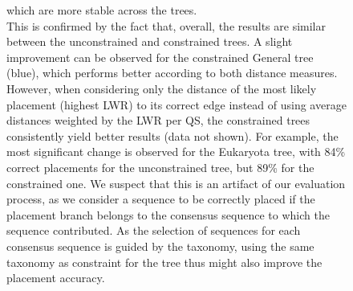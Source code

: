 \begin{figure}[hpbt]
{        which are more stable across the trees.
        \\
        This is confirmed by the fact that, overall,
        the results are similar between the unconstrained and constrained trees.
        A slight improvement can be observed for the constrained General tree (blue),
        which performs better according to both distance measures.
        However, when considering only the distance of the most likely placement (highest \ac{LWR}) to its correct edge
        instead of using average distances weighted by the \ac{LWR} per \ac{QS},
        the constrained trees consistently yield better results (data not shown).
        For example, the most significant change is observed for the Eukaryota tree,
        with 84\% correct placements for the unconstrained tree, but 89\% for the constrained one.
        We suspect that this is an artifact of our evaluation process,
        as we consider a sequence to be correctly placed if the placement branch belongs to the consensus sequence
        to which the sequence contributed.
        As the selection of sequences for each consensus sequence is guided by the taxonomy,
        using the same taxonomy as constraint for the tree thus might also improve the placement accuracy.
    }
    \label{fig:constraints_backbone}
\end{figure}

%
%
%
%
%
%


